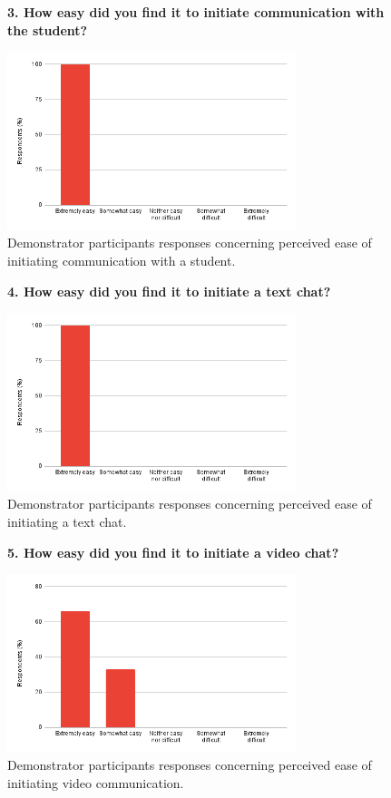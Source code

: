 \begin{figure}[H]
    \centering
    \textbf{3. How easy did you find it to initiate communication with the student?}\par\medskip
    \includegraphics[width=0.75\textwidth]{10evaluation/images/dem3.png}
    \caption{Demonstrator participants responses concerning perceived ease of initiating communication with a student.}
    \label{fig:dem3}
\end{figure}

\begin{figure}[H]
    \centering
    \textbf{4. How easy did you find it to initiate a text chat?}\par\medskip
    \includegraphics[width=0.75\textwidth]{10evaluation/images/dem4.png}
    \caption{Demonstrator participants responses concerning perceived ease of initiating a text chat.}
    \label{fig:dem4}
\end{figure}

\begin{figure}[H]
    \centering
    \textbf{5. How easy did you find it to initiate a video chat?}\par\medskip
    \includegraphics[width=0.75\textwidth]{10evaluation/images/dem5.png}
    \caption{Demonstrator participants responses concerning perceived ease of initiating video communication.}
    \label{fig:dem5}
\end{figure}

